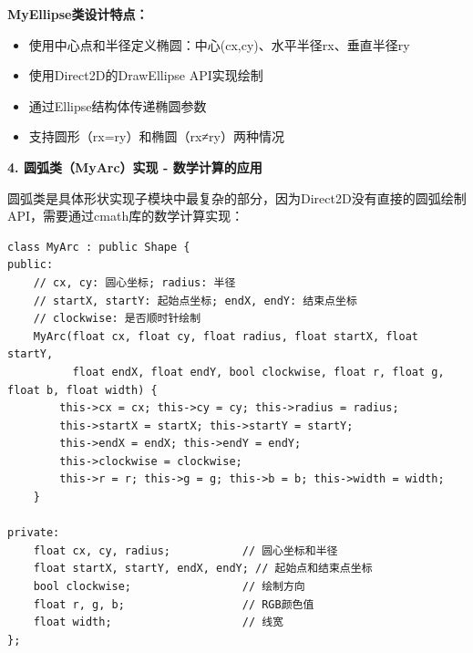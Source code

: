 \documentclass[12pt,a4paper]{article}
\begin{document}
\textbf{MyEllipse类设计特点：}
\begin{itemize}
    \item 使用中心点和半径定义椭圆：中心(cx,cy)、水平半径rx、垂直半径ry
    \item 使用Direct2D的DrawEllipse API实现绘制
    \item 通过Ellipse结构体传递椭圆参数
    \item 支持圆形（rx=ry）和椭圆（rx≠ry）两种情况
\end{itemize}

\textbf{4. 圆弧类（MyArc）实现 - 数学计算的应用}

圆弧类是具体形状实现子模块中最复杂的部分，因为Direct2D没有直接的圆弧绘制API，需要通过cmath库的数学计算实现：

\begin{lstlisting}[caption=圆弧类构造函数和成员变量]
class MyArc : public Shape {
public:
    // cx, cy: 圆心坐标; radius: 半径
    // startX, startY: 起始点坐标; endX, endY: 结束点坐标
    // clockwise: 是否顺时针绘制
    MyArc(float cx, float cy, float radius, float startX, float startY, 
          float endX, float endY, bool clockwise, float r, float g, float b, float width) {
        this->cx = cx; this->cy = cy; this->radius = radius;
        this->startX = startX; this->startY = startY;
        this->endX = endX; this->endY = endY;
        this->clockwise = clockwise;
        this->r = r; this->g = g; this->b = b; this->width = width;
    }

private:
    float cx, cy, radius;           // 圆心坐标和半径
    float startX, startY, endX, endY; // 起始点和结束点坐标
    bool clockwise;                 // 绘制方向
    float r, g, b;                  // RGB颜色值
    float width;                    // 线宽
};
\end{lstlisting}
\end{document}
